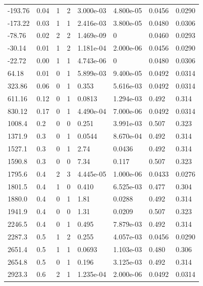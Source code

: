 \documentclass[preview]{standalone}
\begin{document}
{{\begin{tabular}{L{1.2cm}C{1.2cm} C{0.3cm}C{0.5cm} C{1.4cm}C{1.4cm} C{1.4cm}C{1.4cm}}
  -193.76  &  0.04  & 1     &  2 &  3.000e-03  & 4.800e-05  & 0.0456 &  0.0290   \\ 
  -173.22  &  0.03  & 1     &  1 &  2.416e-03  & 3.800e-05  & 0.0480 &  0.0306   \\ 
  -78.76  &  0.02  & 2     &  2 &  1.469e-09  & 0  & 0.0460 &  0.0293   \\ 
  -30.14  &  0.01  & 1     &  2 &  1.181e-04  & 2.000e-06  & 0.0456 &  0.0290   \\ 
  -22.72  &  0.00  & 1     &  1 &  4.743e-06  & 0  & 0.0480 &  0.0306   \\ 
  64.18  &  0.01  & 0     &  1 &  5.899e-03  & 9.400e-05  & 0.0492 &  0.0314   \\ 
  323.86  &  0.06  & 0     &  1 &  0.353  & 5.616e-03  & 0.0492 &  0.0314   \\ 
  611.16  &  0.12  & 0     &  1 &  0.0813  & 1.294e-03  & 0.492 &  0.314   \\ 
  830.12  &  0.17  & 0     &  1 &  4.490e-04  & 7.000e-06  & 0.0492 &  0.0314   \\ 
  1008.4  &   0.2  & 0     &  0 &  0.251  & 3.991e-03  & 0.507 &  0.323   \\ 
  1371.9  &   0.3  & 0     &  1 &  0.0544  & 8.670e-04  & 0.492 &  0.314   \\ 
  1527.1  &   0.3  & 0     &  1 &  2.74  & 0.0436  & 0.492 &  0.314   \\ 
  1590.8  &   0.3  & 0     &  0 &  7.34  & 0.117  & 0.507 &  0.323   \\ 
  1795.6  &   0.4  & 2     &  3 &  4.445e-05  & 1.000e-06  & 0.0433 &  0.0276   \\ 
  1801.5  &   0.4  & 1     &  0 &  0.410  & 6.525e-03  & 0.477 &  0.304   \\ 
  1880.0  &   0.4  & 0     &  1 &  1.81  & 0.0288  & 0.492 &  0.314   \\ 
  1941.9  &   0.4  & 0     &  0 &  1.31  & 0.0209  & 0.507 &  0.323   \\ 
  2246.5  &   0.4  & 0     &  1 &  0.495  & 7.879e-03  & 0.492 &  0.314   \\ 
  2287.3  &   0.5  & 1     &  2 &  0.255  & 4.057e-03  & 0.0456 &  0.0290   \\ 
  2651.4  &   0.5  & 1     &  1 &  0.0693  & 1.103e-03  & 0.480 &  0.306   \\ 
  2654.8  &   0.5  & 0     &  1 &  0.196  & 3.125e-03  & 0.492 &  0.314   \\ 
  2923.3  &   0.6  & 2     &  1 &  1.235e-04  & 2.000e-06  & 0.0492 &  0.0314   \\ 

\end{tabular}}}
\end{document}
